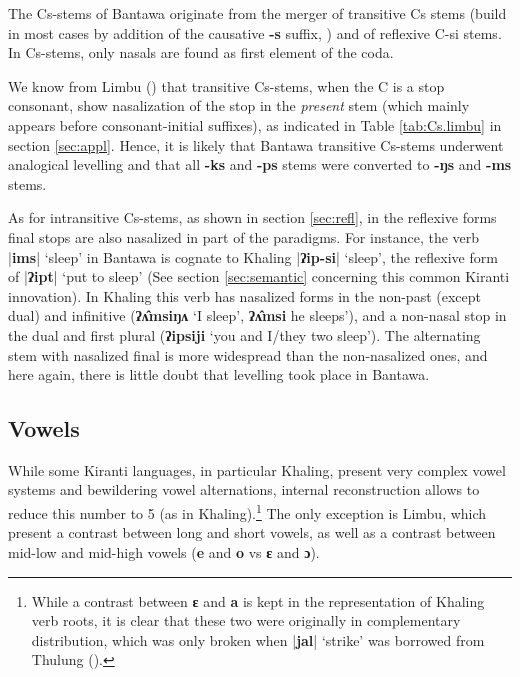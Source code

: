 \documentclass[oldfontcommands,oneside,a4paper,11pt]{article}
\newcommand{\ipa}[1]{\textbf{{\phon\mbox{#1}}}} %
\newcommand{\dhatu}[2]{|\ipa{#1}| `#2'}
\begin{document}
The Cs-stems of Bantawa originate from the merger of transitive Cs stems (build in most cases by addition of the causative \ipa{-s} suffix, \citealt{michailovsky85dental}) and of reflexive C-si stems. In Cs-stems, only nasals are found as first element of the coda. 

We know from Limbu (\citealt[xiii]{michailovsky02dico}) that transitive Cs-stems, when the C is a stop consonant, show nasalization of the stop in the \textit{present} stem (which mainly appears before consonant-initial suffixes), as indicated in Table \ref{tab:Cs.limbu} in section \ref{sec:appl}. Hence, it is likely that Bantawa transitive Cs-stems underwent analogical levelling and that all \ipa{-ks} and \ipa{-ps} stems were converted to \ipa{-ŋs} and \ipa{-ms} stems.

As for intransitive Cs-stems, as shown in section \ref{sec:refl}, in the reflexive forms final stops are also nasalized in part of the paradigms. For instance, the verb \dhatu{ims}{sleep} in Bantawa is cognate to Khaling \dhatu{ʔip-si}{sleep}, the reflexive form of \dhatu{ʔipt}{put to sleep} (See section \ref{sec:semantic} concerning this common Kiranti innovation). In Khaling this verb has nasalized forms in the non-past (except dual) and infinitive (\ipa{ʔʌ̂msiŋʌ} `I sleep', \ipa{ʔʌ̂msi} he sleeps'), and a non-nasal stop in the dual and first plural (\ipa{ʔipsiji} `you and I/they two sleep'). The alternating stem with nasalized final is more widespread than the non-nasalized ones, and here again, there is little doubt that levelling took place in Bantawa.

\subsection{Vowels} \label{sec:vowels}

While some Kiranti languages, in particular Khaling, present very complex vowel systems and bewildering vowel alternations, internal reconstruction allows to reduce this number to 5 (as in Khaling).\footnote{While a contrast between \ipa{ɛ} and \ipa{a} is kept in the representation of Khaling verb roots, it is clear that these two were originally in complementary distribution, which was only broken when \dhatu{jal}{strike} was borrowed from Thulung (\citealt[1110]{jacques12khaling}).} The only exception is Limbu, which present a contrast between long and short vowels, as well as a contrast between mid-low and mid-high vowels (\ipa{e} and \ipa{o} vs \ipa{ɛ} and \ipa{ɔ}).  
\end{document}
